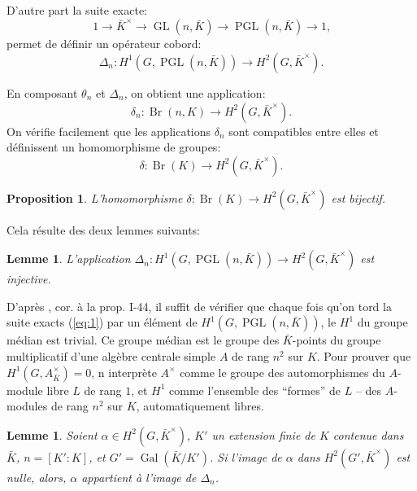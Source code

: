 \documentclass{article}
\DeclareMathOperator{\br}{Br}
\DeclareMathOperator{\gal}{Gal}
\DeclareMathOperator{\gl}{GL}
\DeclareMathOperator{\pgl}{PGL}
\newtheorem{proposition}[subsubsection]{Proposition}
\newtheorem{lemma}[subsubsection]{Lemme}
\begin{document}
D'autre part la suite exacte:
\begin{equation}\label{eq:1}
  1 \to \bar K^\times \to \gl(n,\bar K) \to \pgl(n,\bar K) \to 1\text{,}
\end{equation}
permet de définir un opérateur cobord:
\[
  \Delta_n : H^1\left(G,\pgl(n,\bar K)\right) \to H^2(G,\bar K^\times)\text{.}
\]

En composant $\theta_n$ et $\Delta_n$, on obtient une application:
\[
  \delta_n : \br(n,K) \to H^2(G,\bar K^\times)\text{.}
\]
On vérifie facilement que les applications $\delta_n$ sont compatibles entre 
elles et définissent un homomorphisme de groupes:
\[
  \delta : \br(K) \to H^2(G,\bar K^\times)\text{.}
\]





\begin{proposition}\label{3-1-3}
L'homomorphisme $\delta:\br(K)\to H^2(G,\bar K^\times)$ est bijectif. 
\end{proposition}

Cela résulte des deux lemmes suivants:





\begin{lemma}\label{3-1-4}
L'application 
$\Delta_n:H^1\left(G,\pgl(n,\bar K)\right)\to H^2(G,\bar K^\times)$ est 
injective.
\end{lemma}

D'après \cite{14}, cor. à la prop. I-44, il suffit de vérifier que chaque 
fois qu'on tord la suite exacts (\ref{eq:1}) par un élément de 
$H^1\left(G,\pgl(n,\bar K)\right)$, le $H^1$ du groupe médian est trivial. 
Ce groupe médian est le groupe des $\bar K$-points du groupe multiplicatif 
d'une algèbre centrale simple $A$ de rang $n^2$ sur $K$. Pour prouver que 
$H^1(G,A_{\bar K}^\times) = 0$, n interprète $A^\times$ comme le groupe 
des automorphismes du $A$-module libre $L$ de rang $1$, et $H^1$ comme 
l'ensemble des ``formes'' de $L$ -- des $A$-modules de rang $n^2$ sur $K$, 
automatiquement libres. 





\begin{lemma}\label{3-1-5}
Soient $\alpha\in H^2(G,\bar K^\times)$, $K'$ un extension finie de $K$ 
contenue dans $\bar K$, $n=[K':K]$, et $G'=\gal(\bar K/K')$. Si l'image de 
$\alpha$ dans $H^2(G',\bar K^\times)$ est nulle, alors, $\alpha$ appartient 
à l'image de $\Delta_n$. 
\end{lemma}
\end{document}
